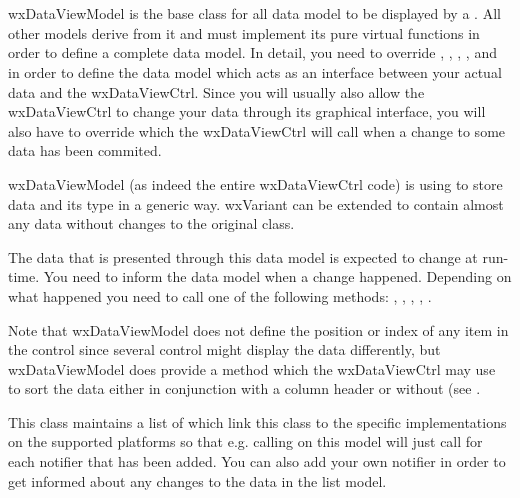 
\section{}\label{wxdataviewmodel}

wxDataViewModel is the base class for all data model to be
displayed by a . 
All other models derive from it and must implement its
pure virtual functions in order to define a complete
data model. In detail, you need to override 
,
,
,
,
 and
 in order to
define the data model which acts as an interface between 
your actual data and the wxDataViewCtrl. Since you will
usually also allow the wxDataViewCtrl to change your data
through its graphical interface, you will also have to override
 which the
wxDataViewCtrl will call when a change to some data has been
commited.

wxDataViewModel (as indeed the entire wxDataViewCtrl
code) is using  to store data and
its type in a generic way. wxVariant can be extended to contain
almost any data without changes to the original class.

The data that is presented through this data model is expected
to change at run-time. You need to inform the data model when
a change happened. Depending on what happened you need to call
one of the following methods: 
,
,
,
,
.

Note that wxDataViewModel does not define the position or
index of any item in the control since several control might
display the data differently, but wxDataViewModel does
provide a  method
which the wxDataViewCtrl may use to sort the data either
in conjunction with a column header or without (see
.

This class maintains a list of 
which link this class to the specific implementations on the
supported platforms so that e.g. calling 
on this model will just call 
for each notifier that has been added. You can also add 
your own notifier in order to get informed about any changes 
to the data in the list model.

